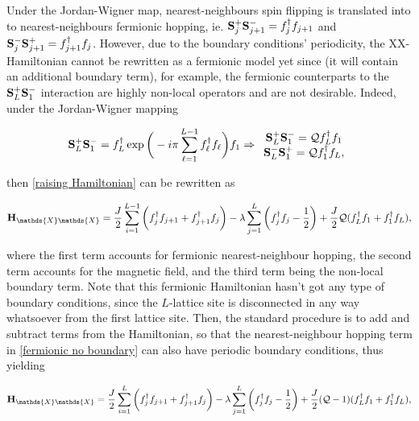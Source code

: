 \documentclass{homework}
\begin{document}
Under the Jordan-Wigner map, nearest-neighbours spin flipping is translated into to nearest-neighbours fermionic hopping, ie. ${\bf S}_{j}^{+} {\bf S}_{j+1}^{-} = f_{j}^{\dagger} f_{j+1}$ and ${\bf S}_{j}^{-} {\bf S}_{j+1}^{+} = f_{j+1}^{\dagger} f_{j}$. However, due to the boundary conditions' periodicity, the XX-Hamiltonian cannot be rewritten as a fermionic model yet since (it will contain an additional boundary term), for example, the fermionic counterparts to the ${\bf S}_{L}^{+} {\bf S}_{1}^{-}$ interaction are highly non-local operators and are not desirable. Indeed, under the Jordan-Wigner mapping 

\begin{equation*}
    {\bf S}_{L}^{+} {\bf S}_{1}^{-} = f_L^\dagger \exp\bigg(-i\pi \sum_{\ell = 1}^{L-1} f_\ell^\dagger f_\ell \bigg) f_1 \Rightarrow \begin{array}{cc}
       {\bf S}_{L}^{+} {\bf S}_{1}^{-} = \mathcal{Q} f_L^\dagger f_1 \\
       {\bf S}_{L}^{-} {\bf S}_{1}^{+} = \mathcal{Q} f_1^\dagger f_L,
    \end{array}
\end{equation*}


then \eqref{raising Hamiltonian} can be rewritten as 

\begin{equation}
    {\bf H}_{\mathds{X}\mathds{X}} = \frac{J}{2} \sum_{i=1}^{L-1} \bigg(f_{j}^{\dagger} f_{j+1} + f_{j+1}^{\dagger} f_j\bigg) - \lambda \sum_{j=1}^{L} \bigg(f_{j}^{\dagger} f_{j} - \frac{1}{2}\bigg) + \frac{J}{2} \mathcal{Q} (f_L^\dagger f_1 + f_1^\dagger f_L),
    \label{fermionic no boundary}
\end{equation}

where the first term accounts for fermionic nearest-neighbour hopping, the second term accounts for the magnetic field, and the third term being the non-local boundary term. Note that this fermionic Hamiltonian hasn't got any type of boundary conditions, since the $L$-lattice site is disconnected in any way whatsoever from the first lattice site. Then, the standard procedure is to add and subtract terms from the Hamiltonian, so that the nearest-neighbour hopping term in \eqref{fermionic no boundary} can also have periodic boundary conditions, thus yielding 

\begin{equation}
    {\bf H}_{\mathds{X}\mathds{X}}  = \frac{J}{2} \sum_{i=1}^{L} \bigg(f_{j}^{\dagger} f_{j+1} + f_{j+1}^{\dagger} f_j\bigg) - \lambda \sum_{j=1}^{L} \bigg(f_{j}^{\dagger} f_{j} - \frac{1}{2}\bigg) + \frac{J}{2} (\mathcal{Q}-1) (f_L^\dagger f_1 + f_1^\dagger f_L),
    \label{true fermionic hamiltonian}
\end{equation}
\end{document}

